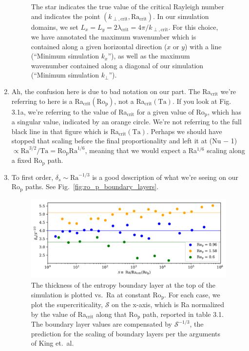 \documentclass[aps, pre, onecolumn, nofootinbib, notitlepage, groupedaddress, amsfonts, amssymb, amsmath, longbibliography, superscriptaddress]{revtex4-1}
\begin{document}
\begin{enumerate}
\begin{figure}[t!]
{	The star indicates the true value of the critical Rayleigh number and indicates the point $(k_{\perp, \text{crit}}, \text{Ra}_{\text{crit}})$.
	In our simulation domains, we set $L_x = L_y = 2 \lambda_\text{crit} = 4\pi / k_{\perp, \text{crit}}$.
	For this choice, we have annotated the maximum wavenumber which is contained along a given horizontal direction ($x$ or $y$) with a line (``Minimum simulation $k_x$''), as well as the maximum wavenumber contained along a diagonal of our simulation (``Minimum simulation $k_\perp$'').
	\label{fig:ta1e10_onset} }
\end{figure}
\item Ah, the confusion here is due to bad notation on our part.
The Ra$_{\text{crit}}$ we're referring to here is a Ra$_{\text{crit}}(\text{Ro}_{\text{p}})$, not a Ra$_{\text{crit}}(\text{Ta})$.
If you look at Fig.~ 3.1a, we're referring to the value of Ra$_{\text{crit}}$ for a given value of $\text{Ro}_\text{p}$, which has a singular value, indicated by an orange circle.
We're not referring to the full black line in that figure which is Ra$_{\text{crit}}(\text{Ta})$.
Perhaps we should have stopped that scaling before the final proportionality and left it at (Nu − 1) $\propto \text{Ra}^{3/2} / \text{Ta} = \text{Ro}_{\text{p}} \text{Ra}^{1/6}$, meaning that we would expect a Ra$^{1/6}$ scaling along a fixed Ro$_{\text{p}}$ path.
\item To first order, $\delta_s \sim \text{Ra}^{-1/3}$ is a good description of what we're seeing on our Ro$_\text{p}$ paths.
See Fig.~\ref{fig:ro_p_boundary_layers}.
\begin{figure}[t!]
\includegraphics[width=\textwidth]{./figs/ro_p_boundary_layers.pdf}
\caption{ 
	The thickness of the entropy boundary layer at the top of the simulation is plotted vs.~Ra at constant Ro$_{\text{p}}$.
	For each case, we plot the supercriticality, $\mathcal{S}$ on the x-axis, which is Ra normalized by the value of Ra$_{\text{crit}}$ along that Ro$_{\text{p}}$ path, reported in table 3.1.
	The boundary layer values are compensated by $\mathcal{S}^{-1/3}$, the prediction for the scaling of boundary layers per the arguments of King et.~al.
}
\end{figure}
\end{enumerate}
\end{document}
